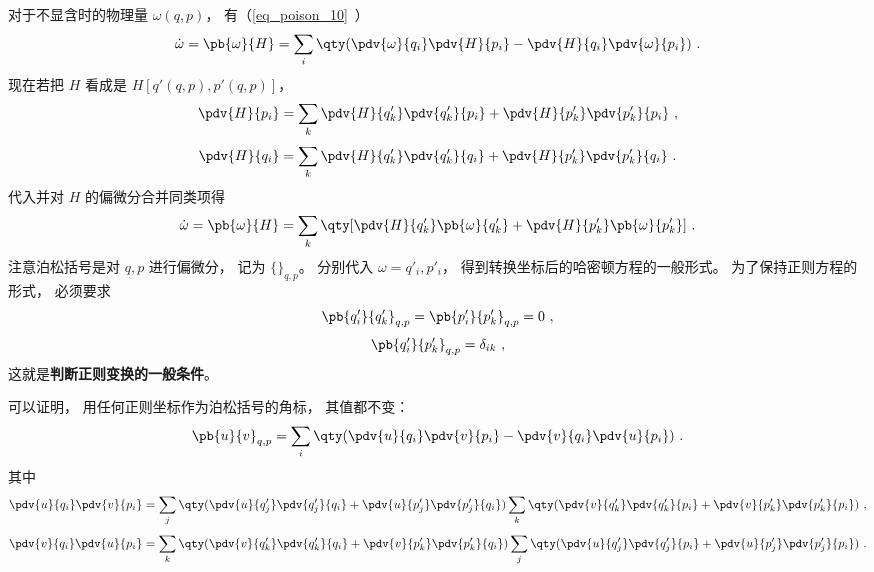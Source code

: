 对于不显含时的物理量 $\omega(q, p)$， 有（\autoref{eq_poison_10}~）
\begin{equation}
\dot \omega  = \pb{\omega}{H}  = \sum_i \qty(\pdv{\omega}{q_i}\pdv{H}{p_i} - \pdv{H}{q_i} \pdv{\omega}{p_i})~.
\end{equation}
现在若把 $H$ 看成是 $H[q'(q,p),p'(q,p)]$，  
\begin{equation}
\pdv{H}{p_i} = \sum_k \pdv{H}{q'_k} \pdv{q'_k}{p_i} + \pdv{H}{p'_k} \pdv{p'_k}{p_i}~,
\end{equation}
\begin{equation}
\pdv{H}{q_i} = \sum_k \pdv{H}{q'_k} \pdv{q'_k}{q_i} + \pdv{H}{p'_k} \pdv{p'_k}{q_i}~.
\end{equation}
代入并对 $H$ 的偏微分合并同类项得
\begin{equation}
\dot \omega  = \pb{\omega}{H} = \sum_k \qty[ \pdv{H}{q'_k} \pb{\omega}{q'_k} + \pdv{H}{p'_k} \pb{\omega}{p'_k}]~.
\end{equation}
注意泊松括号是对 $q,p$ 进行偏微分， 记为 $\{ {}\}_{q,p}$。  分别代入 $\omega  = q'_i, p'_i$，  得到转换坐标后的哈密顿方程的一般形式。 为了保持正则方程的形式， 必须要求
\begin{equation}
\pb{q'_i}{q'_k}_{q,p} = \pb{p'_i}{p'_k}_{q,p} = 0~,
\end{equation}
\begin{equation}\label{eq_ClsMec_2}
\pb{q'_i}{p'_k}_{q,p} = \delta_{ik}~,
\end{equation}
这就是\textbf{判断正则变换的一般条件}。

可以证明， 用任何正则坐标作为泊松括号的角标， 其值都不变：
\begin{equation}\label{eq_ClsMec_1}
\pb{u}{v}_{q,p} = \sum_i \qty( \pdv{u}{q_i}\pdv{v}{p_i} - \pdv{v}{q_i}\pdv{u}{p_i} ) ~.
\end{equation}
其中
\begin{equation}
\pdv{u}{q_i} \pdv{v}{p_i} = \sum_j \qty( \pdv{u}{q'_j} \pdv{q'_j}{q_i} + \pdv{u}{p'_j}\pdv{p'_j}{q_i} ) \sum_k \qty(\pdv{v}{q'_k}\pdv{q'_k}{p_i} + \pdv{v}{p'_k}\pdv{p'_k}{p_i}) ~,
\end{equation}
\begin{equation}
\pdv{v}{q_i} \pdv{u}{p_i} = \sum_k \qty( \pdv{v}{q'_k}\pdv{q'_k}{q_i} + \pdv{v}{p'_k}\pdv{p'_k}{q_i} ) \sum_j \qty(\pdv{u}{q'_j}\pdv{q'_j}{p_i} + \pdv{u}{p'_j}\pdv{p'_j}{p_i})~.
\end{equation}
 

